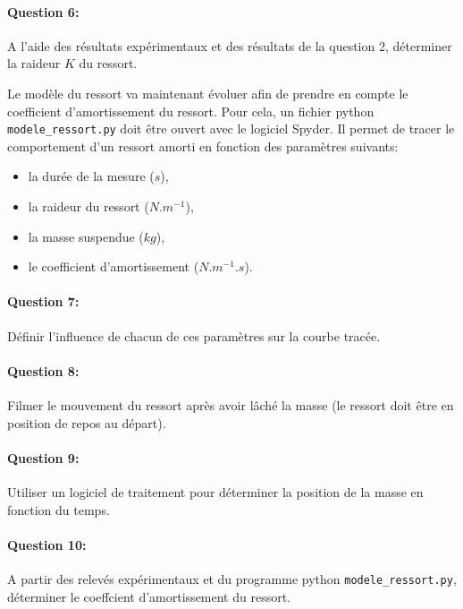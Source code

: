 
\paragraph{Question 6:} A l'aide des résultats expérimentaux et des résultats de la question 2, déterminer la raideur $K$ du ressort.


Le modèle du ressort va maintenant évoluer afin de prendre en compte le coefficient d'amortissement du ressort. Pour cela, un fichier python \verb?modele_ressort.py? doit être ouvert avec le logiciel Spyder. Il permet de tracer le comportement d'un ressort amorti en fonction des paramètres suivants:
\begin{itemize}
 \item la durée de la mesure ($s$),
 \item la raideur du ressort ($N.m^{-1}$),
 \item la masse suspendue ($kg$),
 \item le coefficient d'amortissement ($N.m^{-1}.s$).
\end{itemize}

\paragraph{Question 7:} Définir l'influence de chacun de ces paramètres sur la courbe tracée.


\paragraph{Question 8:} Filmer le mouvement du ressort après avoir lâché la masse (le ressort doit être en position de repos au départ).

\paragraph{Question 9:} Utiliser un logiciel de traitement pour déterminer la position de la masse en fonction du temps.


\paragraph{Question 10:} A partir des relevés expérimentaux et du programme python \verb?modele_ressort.py?, déterminer le coeffcient d'amortissement du ressort.


